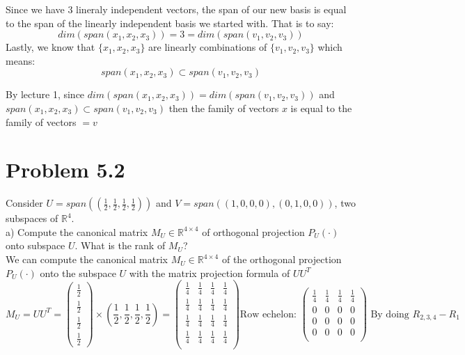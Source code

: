 \documentclass[12pt,twoside]{article}
\begin{document}
Since we have 3 lineraly independent vectors, the span of our new basis is equal to the span of the linearly independent basis we started with. That is to say:
$$
    dim(span(x_1,x_2,x_3))  = 3 = dim(span(v_1,v_2,v_3))
$$
Lastly, we know that $\{x_1,x_2,x_3 \}$ are linearly combinations of $\{v_1, v_2, v_3 \}$ which means:
$$
    span(x_1,x_2,x_3) \subset span(v_1,v_2,v_3)
$$  

By lecture 1, since $dim(span(x_1,x_2,x_3)) = dim(span(v_1,v_2,v_3))$ and $span(x_1,x_2,x_3) \subset span(v_1,v_2,v_3)$ then the family of vectors $x$ is equal to the family of vectors $=v$

\break


\section{Problem 5.2}
Consider $ U = span((\frac 1 2, \frac 1 2, \frac 1 2, \frac 1 2))$ and $V = span((1, 0, 0, 0),(0, 1, 0, 0))$, two subspaces of $\mathbb{R}^4$. \\

a) Compute the canonical matrix $M_U \in \mathbb{R}^{4\times 4}$ of orthogonal projection $P_U(\cdot)$ onto subspace $U$. What is the rank of $M_U$?
\\

We can compute the canonical matrix $M_U \in \mathbb{R}^{4\times 4}$ of the orthogonal projection  $P_U(\cdot)$ onto the subspace $U$ with the matrix projection formula of $UU^T$
$$
    M_U = UU^T = \begin{pmatrix} \frac{1}{2} \\ \frac{1}{2} \\ \frac{1}{2} \\ \frac{1}{2} \end{pmatrix} \times (\frac{1}{2}, \frac{1}{2}, \frac{1}{2}, \frac{1}{2}) = \begin{pmatrix}
        \frac{1}{4} & \frac{1}{4} & \frac{1}{4} & \frac{1}{4} \\
        \frac{1}{4} & \frac{1}{4} & \frac{1}{4} & \frac{1}{4} \\
        \frac{1}{4} & \frac{1}{4} & \frac{1}{4} & \frac{1}{4} \\
        \frac{1}{4} & \frac{1}{4} & \frac{1}{4} & \frac{1}{4} \\
    \end{pmatrix} \text{Row echelon: } \begin{pmatrix} 
        \frac{1}{4} & \frac{1}{4} & \frac{1}{4} & \frac{1}{4} \\
        0 & 0 & 0 & 0\\
        0 & 0 & 0 & 0 \\
        0 & 0 & 0 & 0 \\
        \end{pmatrix} \text{ By doing $R_{2,3,4} - R_1$}
 $$
 
\end{document}

